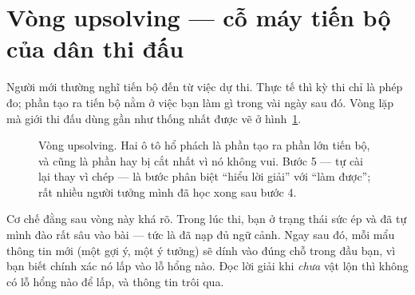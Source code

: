 \documentclass[../../algorithm.tex]{subfiles}
\begin{document}
\section{Vòng upsolving --- cỗ máy tiến bộ của dân thi đấu}

Người mới thường nghĩ tiến bộ đến từ việc dự thi. Thực tế thì kỳ thi chỉ là phép đo; phần tạo ra tiến bộ nằm ở việc bạn làm gì trong vài ngày sau đó. Vòng lặp mà giới thi đấu dùng gần như thống nhất được vẽ ở hình~\ref{fig:upsolve}.

\begin{figure}[H]\centering
{}
\caption{Vòng upsolving. Hai ô tô hổ phách là phần tạo ra phần lớn tiến bộ, và cũng là phần hay bị cắt nhất vì nó không vui. Bước 5 --- tự cài lại thay vì chép --- là bước phân biệt ``hiểu lời giải'' với ``làm được''; rất nhiều người tưởng mình đã học xong sau bước 4.}
\label{fig:upsolve}
\end{figure}

Cơ chế đằng sau vòng này khá rõ. Trong lúc thi, bạn ở trạng thái sức ép và đã tự mình đào rất sâu vào bài --- tức là đã nạp đủ ngữ cảnh. Ngay sau đó, mỗi mẩu thông tin mới (một gợi ý, một ý tưởng) sẽ dính vào đúng chỗ trong đầu bạn, vì bạn biết chính xác nó lấp vào lỗ hổng nào. Đọc lời giải khi \emph{chưa} vật lộn thì không có lỗ hổng nào để lấp, và thông tin trôi qua.
\end{document}
